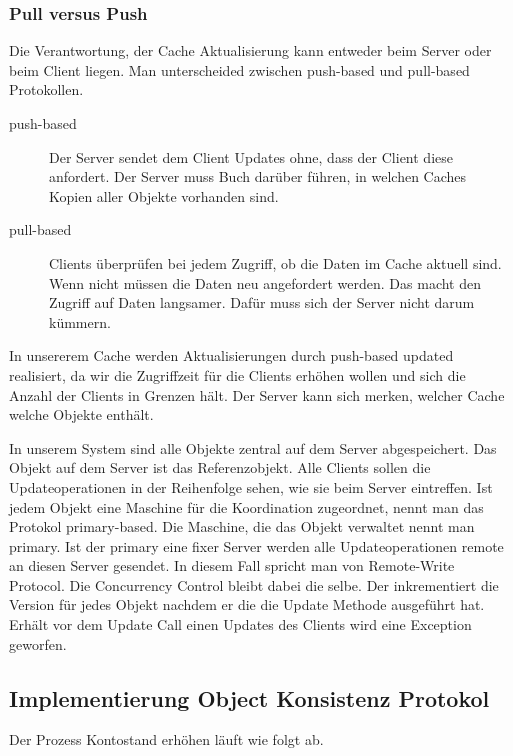 \subsubsection{Pull versus Push}
\label{sec:pull-versus-push}

Die Verantwortung, der Cache Aktualisierung kann entweder beim Server oder beim Client liegen. Man unterscheided zwischen push-based und pull-based Protokollen.

\begin{description}
\item[push-based] Der Server sendet dem Client Updates ohne, dass der Client diese anfordert. Der Server muss Buch darüber führen, in welchen Caches Kopien aller Objekte vorhanden sind.
\item[pull-based] Clients überprüfen bei jedem Zugriff, ob die Daten im Cache aktuell sind. Wenn nicht müssen die Daten neu angefordert werden. Das macht den Zugriff auf Daten langsamer. Dafür muss sich der Server nicht darum kümmern.
\end{description}

In unsererem Cache werden Aktualisierungen durch push-based updated realisiert, da wir die Zugriffzeit für die Clients erhöhen wollen und sich die Anzahl der Clients in Grenzen hält. Der Server kann sich merken, welcher Cache welche Objekte enthält.

In unserem System sind alle Objekte zentral auf dem Server abgespeichert. Das Objekt auf dem Server ist das Referenzobjekt. Alle Clients sollen die Updateoperationen in der Reihenfolge sehen, wie sie beim Server eintreffen. Ist jedem Objekt eine Maschine für die Koordination zugeordnet, nennt man das Protokol primary-based. Die Maschine, die das Objekt verwaltet nennt man primary. Ist der primary eine fixer Server werden alle Updateoperationen remote an diesen Server gesendet. In diesem Fall spricht man von Remote-Write Protocol. Die Concurrency Control bleibt dabei die selbe. Der inkrementiert die Version für jedes Objekt nachdem er die die Update Methode ausgeführt hat. Erhält vor dem Update Call einen Updates des Clients wird eine Exception geworfen.

\subsection{Implementierung Object Konsistenz Protokol}
\label{sec:impl-object-kons}

Der Prozess Kontostand erhöhen läuft wie folgt ab.

